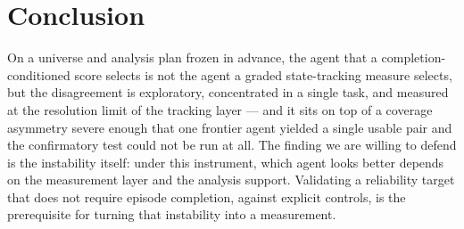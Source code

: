 \documentclass{article}
\begin{document}
\section{Conclusion}

On a universe and analysis plan frozen in advance, the agent that a completion-conditioned score selects is not the agent a graded state-tracking measure selects, but the disagreement is exploratory, concentrated in a single task, and measured at the resolution limit of the tracking layer --- and it sits on top of a coverage asymmetry severe enough that one frontier agent yielded a single usable pair and the confirmatory test could not be run at all.
The finding we are willing to defend is the instability itself: under this instrument, which agent looks better depends on the measurement layer and the analysis support.
Validating a reliability target that does not require episode completion, against explicit controls, is the prerequisite for turning that instability into a measurement.




\newpage

\end{document}
